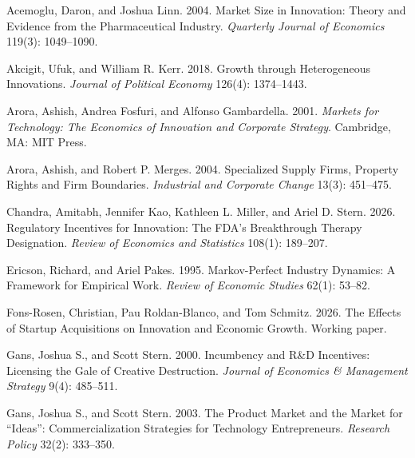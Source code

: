 \documentclass[12pt]{article}
\newcommand{\1}{\mathbf{1}}
\begin{document}
\begin{thebibliography}{}

Acemoglu, Daron, and Joshua Linn. 2004.
\newblock Market Size in Innovation: Theory and Evidence from the Pharmaceutical Industry.
\newblock \emph{Quarterly Journal of Economics} 119(3): 1049--1090.

Akcigit, Ufuk, and William R. Kerr. 2018.
\newblock Growth through Heterogeneous Innovations.
\newblock \emph{Journal of Political Economy} 126(4): 1374--1443.

Arora, Ashish, Andrea Fosfuri, and Alfonso Gambardella. 2001.
\newblock \emph{Markets for Technology: The Economics of Innovation and Corporate Strategy}.
\newblock Cambridge, MA: MIT Press.

Arora, Ashish, and Robert P. Merges. 2004.
\newblock Specialized Supply Firms, Property Rights and Firm Boundaries.
\newblock \emph{Industrial and Corporate Change} 13(3): 451--475.

Chandra, Amitabh, Jennifer Kao, Kathleen L. Miller, and Ariel D. Stern. 2026.
\newblock Regulatory Incentives for Innovation: The FDA's Breakthrough Therapy Designation.
\newblock \emph{Review of Economics and Statistics} 108(1): 189--207.

Ericson, Richard, and Ariel Pakes. 1995.
\newblock Markov-Perfect Industry Dynamics: A Framework for Empirical Work.
\newblock \emph{Review of Economic Studies} 62(1): 53--82.

Fons-Rosen, Christian, Pau Roldan-Blanco, and Tom Schmitz. 2026.
\newblock The Effects of Startup Acquisitions on Innovation and Economic Growth.
\newblock Working paper.

Gans, Joshua S., and Scott Stern. 2000.
\newblock Incumbency and R\&D Incentives: Licensing the Gale of Creative Destruction.
\newblock \emph{Journal of Economics \& Management Strategy} 9(4): 485--511.

Gans, Joshua S., and Scott Stern. 2003.
\newblock The Product Market and the Market for ``Ideas'': Commercialization Strategies for Technology Entrepreneurs.
\newblock \emph{Research Policy} 32(2): 333--350.


\end{thebibliography}
\end{document}
